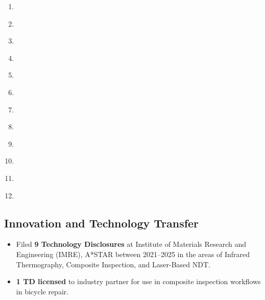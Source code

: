 \documentclass{my_cv}%
\begin{document}
\begin{enumerate}
\item \label{C26}  
\item \label{C27}  
\item \label{C28}  
\item \label{C29}  
\item \label{C30}  
\item \label{C31}  
\item \label{C32}  
\item \label{C33}  
\item \label{C34}  
\item \label{C35}  
\item \label{C36}  
\item \label{C37}  
\end{enumerate}
\subsection{\faLightbulbO \hspace{0.5em}\bfseries Innovation and Technology Transfer}

\begin{itemize}
\setlength\itemsep{-0.1em}
  \item Filed \textbf{9 Technology Disclosures} at Institute of Materials Research and Engineering (IMRE), A*STAR between 2021–2025 in the areas of Infrared Thermography, Composite Inspection, and Laser-Based NDT.
  \item \textbf{1 TD licensed} to industry partner for use in  composite inspection workflows in bicycle repair.
\end{itemize}
\end{document}
